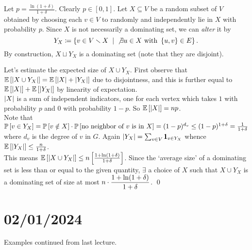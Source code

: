 \begin{pf}
Let $p=\frac{\ln(1+\delta)}{1+\delta}$. Clearly $p\in [0,1]$. Let $X\subseteq V$
 be a random subset of $V$ obtained by choosing each $v\in V$ to randomly and independently lie in $X$ with probability $p$. Since $X$ is not necessarily a dominating set, we can \textit{alter} it by $$Y_X\sett\set{v\in V\smallsetminus X\st \not\exists u\in X \text{ with } \set{u,v}\in E}.$$
By construction, $X\sqcup Y_X$ is a dominating set (note that they are disjoint).

Let's estimate the expected size of $X\cup Y_X$. First observe that $\E{\abs{X\cup Y_X}} = \E{\abs X + \abs {Y_X}}$ due to disjointness, and this is further equal to $\E{\abs X} + \E{\abs {Y_X}}$ by linearity of expectation.\\
$\abs X$ is a sum of independent indicators, one for each vertex which takes $1$ with probability $p$ and $0$ with probability $1-p$. So $\E{\abs X} = np$.\\
Note that $\P{v\in Y_X} = \P{v\notin X}\cdot \P{\text{no neighbor of } v \text{ is in } X} = (1-p)^{d_v} \leq (1-p)^{1+\delta} =\frac{1}{1+\delta}$ where $d_v$ is the degree of $v$ in $G$. Again $\abs{Y_X} = \sum_{v\in V} \pmb 1_{v\in Y_X}$ whence $\E{\abs {Y_X}} \leq \frac n {1+\delta}$. \\
This means $\E{\abs{X\cup Y_X}} \leq n\left[\frac{1+\ln(1+\delta)}{1+\delta}\right]$. Since the `average size' of a dominating set is less than or equal to the given quantity, $\exists$ a choice of $X$ such that $X\cup Y_X$ is a dominating set of size at most $\ds n\cdot \frac{1+\ln(1+\delta)}{1+\delta}$.
\qed\end{pf}






\chapter{02/01/2024}

Examples continued from last lecture.

